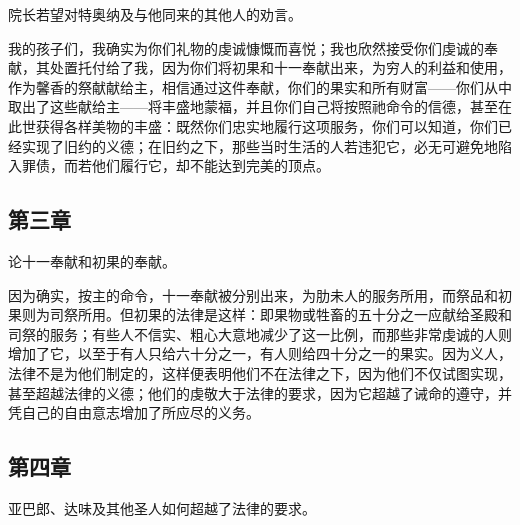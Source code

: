 院长若望对特奥纳及与他同来的其他人的劝言。\par

我的孩子们，我确实为你们礼物的虔诚慷慨而喜悦；我也欣然接受你们虔诚的奉献，其处置托付给了我，因为你们将初果和十一奉献出来，为穷人的利益和使用，作为馨香的祭献献给主，相信通过这件奉献，你们的果实和所有财富——你们从中取出了这些献给主——将丰盛地蒙福，并且你们自己将按照祂命令的信德，甚至在此世获得各样美物的丰盛：既然你们忠实地履行这项服务，你们可以知道，你们已经实现了旧约的义德；在旧约之下，那些当时生活的人若违犯它，必无可避免地陷入罪债，而若他们履行它，却不能达到完美的顶点。\par


\subsection{第三章}

论十一奉献和初果的奉献。\par

因为确实，按主的命令，十一奉献被分别出来，为肋未人的服务所用，而祭品和初果则为司祭所用。但初果的法律是这样：即果物或牲畜的五十分之一应献给圣殿和司祭的服务；有些人不信实、粗心大意地减少了这一比例，而那些非常虔诚的人则增加了它，以至于有人只给六十分之一，有人则给四十分之一的果实。因为义人，法律不是为他们制定的，这样便表明他们不在法律之下，因为他们不仅试图实现，甚至超越法律的义德；他们的虔敬大于法律的要求，因为它超越了诫命的遵守，并凭自己的自由意志增加了所应尽的义务。\par


\subsection{第四章}

亚巴郎、达味及其他圣人如何超越了法律的要求。\par

